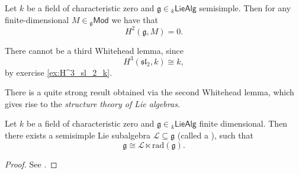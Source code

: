 \begin{theorem}
	\label{thm:Wfl}
	Let $k$ be a field of characteristic zero and $\mathfrak{g} \in {_{k}}\mathsf{LieAlg}$ semisimple. Then for any finite-dimensional $M \in {_{\mathfrak{g}}}\mathsf{Mod}$ we have that
	\begin{equation*}
		H^2(\mathfrak{g},M) = 0.
	\end{equation*}
\end{theorem}

\begin{remark}
	There cannot be a third Whitehead lemma, since
	\begin{equation*}
		H^3(\mathfrak{sl}_2,k) \cong k,
	\end{equation*}
	\noindent by exercise \ref{ex:H^3_sl_2_k}.
\end{remark}

There is a quite strong result obtained via the second Whitehead lemma, which gives rise to the \emph{structure theory of Lie algebras}.

\begin{theorem}
	Let $k$ be a field of characteristic zero and $\mathfrak{g} \in {_k}\mathsf{LieAlg}$ finite dimensional. Then there exists a semisimple Lie subalgebra $\mathcal{L} \subseteq \mathfrak{g}$ (called a ), such that
	\begin{equation*}
		\mathfrak{g} \cong \mathcal{L} \ltimes \mathrm{rad}(\mathfrak{g}).
	\end{equation*}
\end{theorem}

\begin{proof}
	See \cite[247]{weibel:homological_algebra:1994}.
\end{proof}

\printbibliography

